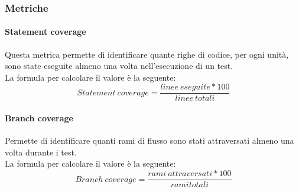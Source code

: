 \documentclass[../PianoDiQualifica.tex]{subfiles}
\begin{document}
			\subsubsection{Metriche}
				\paragraph{Statement coverage}
				Questa metrica permette di identificare quante righe di codice, per ogni unità, sono state eseguite almeno una volta nell'esecuzione di un test.\\La formula per calcolare il valore è la seguente:
				\begin{equation*}
					Statement \ coverage = \frac{linee \ eseguite * 100}{linee \ totali}
				\end{equation*}
				
				\paragraph{Branch coverage}
				Permette di identificare quanti rami di flusso sono stati attraversati almeno una volta durante i test.\\La formula per calcolare il valore è la seguente:
				\begin{equation*}
					Branch \ coverage = \frac{rami \ attraversati* 100}{rami totali}
				\end{equation*}
\end{document}
